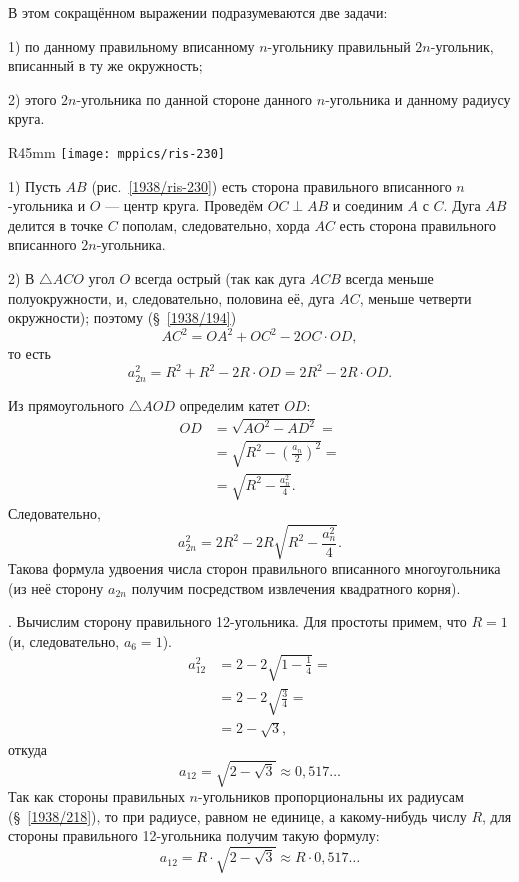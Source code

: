 В этом сокращённом выражении подразумеваются две задачи:

1) по данному правильному вписанному $n$-угольнику  правильный $2n$-угольник, вписанный в ту же окружность;

2)  этого $2n$-угольника по данной стороне данного $n$-угольника и данному радиусу круга.

\begin{wrapfigure}{R}{45mm}
\centering
\texttt{[image: mppics/ris-230]}
\caption{}\label{1938/ris-230}
\end{wrapfigure}

1) Пусть $AB$ (рис.~\ref{1938/ris-230}) есть сторона правильного вписанного $n$-угольника и $O$ — центр круга.
Проведём $OC\perp AB$ и соединим $A$ с $C$.
Дуга $AB$ делится в точке $C$ пополам, следовательно, хорда $AC$ есть сторона правильного вписанного $2n$-угольника.

2) В $\triangle ACO$ угол $O$ всегда острый (так как дуга $ACB$ всегда меньше полуокружности, и, следовательно, половина её, дуга $AC$, меньше четверти окружности);
поэтому (§~\ref{1938/194})
\[AC^2=OA^2+OC^2-2OC\cdot OD,\]
то есть
\[a_{2n}^2=R^2+R^2-2R\cdot OD=2R^2-2R\cdot OD.\]

Из прямоугольного $\triangle AOD$ определим катет $OD$:
\begin{align*}
OD&=\sqrt{AO^2-AD^2}=
\\
&=\sqrt{R^2-(\tfrac{a_n}2)^2}=
\\
&=\sqrt{R^2-\tfrac{a_n^2}4}.
\end{align*}
Следовательно,
\[a_{2n}^2=2R^2-2R\sqrt{R^2-\frac{a_n^2}4}.\]
Такова формула удвоения числа сторон правильного вписанного многоугольника (из неё сторону $a_{2n}$ получим посредством извлечения квадратного корня).

\smallskip
{}.
Вычислим сторону правильного 12-угольника.
Для простоты примем, что $R=1$ (и, следовательно, $a_6 = 1$).
\begin{align*}
a_{12}^2&=2-2\sqrt{1-\tfrac14}=
\\
&=2-2\sqrt{\tfrac34}=
\\
&=2-\sqrt{3},
\end{align*}
откуда
\[a_{12}=\sqrt{2-\sqrt3}\approx 0{,}517\dots\]
Так как стороны правильных $n$-угольников пропорциональны их радиусам (§~\ref{1938/218}), то при радиусе, равном не единице, а какому-нибудь числу $R$, для стороны правильного 12-угольника получим такую формулу:
\[a_{12}=R\cdot \sqrt{2-\sqrt3}\approx R\cdot 0{,}517\dots\]


